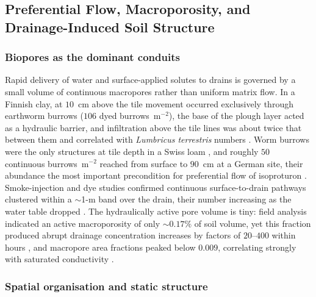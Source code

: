 \subsection{Preferential Flow, Macroporosity, and Drainage-Induced Soil Structure}

\subsubsection{Biopores as the dominant conduits}

Rapid delivery of water and surface-applied solutes to drains is governed by
a small volume of continuous macropores rather than uniform matrix flow. In a
Finnish clay, at $10$~cm above the tile movement occurred exclusively through
earthworm burrows ($106$ dyed burrows~m$^{-2}$), the base of the plough layer
acted as a hydraulic barrier, and infiltration above the tile lines was about
twice that between them and correlated with \textit{Lumbricus terrestris}
numbers \parencite{Shipitalo2004}. Worm burrows were the only structures at
tile depth in a Swiss loam \parencite{Stamm2002}, and roughly $50$ continuous
burrows~m$^{-2}$ reached from surface to $90$~cm at a German site, their
abundance the most important precondition for preferential flow of isoproturon
\parencite{Zehe2001}. Smoke-injection and dye studies confirmed continuous
surface-to-drain pathways clustered within a $\sim$1-m band over the drain,
their number increasing as the water table dropped
\parencite{Nielsen2015,Petersen2012}. The hydraulically active pore volume is
tiny: field analysis indicated an active macroporosity of only $\sim0.17\%$ of
soil volume, yet this fraction produced abrupt drainage concentration
increases by factors of $20$--$400$ within hours \parencite{Villholth1998},
and macropore area fractions peaked below $0.009$, correlating strongly with
saturated conductivity \parencite{Frey2011}.

\subsubsection{Spatial organisation and static structure}

